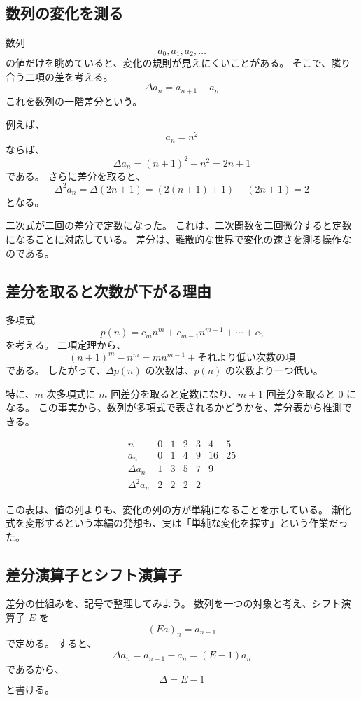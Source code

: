 \subsection{数列の変化を測る}

数列
\[
  a_0,a_1,a_2,\ldots
\]
の値だけを眺めていると、変化の規則が見えにくいことがある。
そこで、隣り合う二項の差を考える。
\[
  \Delta a_n=a_{n+1}-a_n
\]
これを数列の一階差分という。

例えば、
\[
  a_n=n^2
\]
ならば、
\[
  \Delta a_n=(n+1)^2-n^2=2n+1
\]
である。
さらに差分を取ると、
\[
  \Delta^2a_n
  =\Delta(2n+1)
  =(2(n+1)+1)-(2n+1)=2
\]
となる。

二次式が二回の差分で定数になった。
これは、二次関数を二回微分すると定数になることに対応している。
差分は、離散的な世界で変化の速さを測る操作なのである。

\subsection{差分を取ると次数が下がる理由}

多項式
\[
  p(n)=c_mn^m+c_{m-1}n^{m-1}+\cdots+c_0
\]
を考える。
二項定理から、
\[
  (n+1)^m-n^m
  =mn^{m-1}+\text{それより低い次数の項}
\]
である。
したがって、$\Delta p(n)$ の次数は、$p(n)$ の次数より一つ低い。

特に、$m$ 次多項式に $m$ 回差分を取ると定数になり、$m+1$ 回差分を取ると $0$ になる。
この事実から、数列が多項式で表されるかどうかを、差分表から推測できる。

\[
\begin{array}{c|cccccc}
n&0&1&2&3&4&5\\ \hline
a_n&0&1&4&9&16&25\\
\Delta a_n&1&3&5&7&9&\\
\Delta^2a_n&2&2&2&2&&
\end{array}
\]

この表は、値の列よりも、変化の列の方が単純になることを示している。
漸化式を変形するという本編の発想も、実は「単純な変化を探す」という作業だった。

\subsection{差分演算子とシフト演算子}

差分の仕組みを、記号で整理してみよう。
数列を一つの対象と考え、シフト演算子 $E$ を
\[
  (Ea)_n=a_{n+1}
\]
で定める。
すると、
\[
  \Delta a_n=a_{n+1}-a_n=(E-1)a_n
\]
であるから、
\[
  \Delta=E-1
\]
と書ける。

